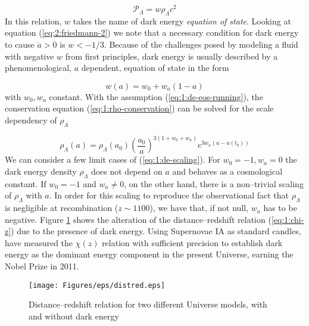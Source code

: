 \begin{equation}
\label{eq:1:de-eos}
\mathcal{P}_\Lambda = w\rho_\Lambda c^2
\end{equation}
%
In this relation, $w$ takes the name of dark energy \textit{equation of state}. Looking at equation (\ref{eq:2:friedmann-2}) we note that a necessary condition for dark energy to cause $\ddot{a}>0$ is $w<-1/3$. Because of the challenges posed by modeling a fluid with negative $w$ from first principles, dark energy is usually described by a phenomenological, $a$ dependent, equation of state in the form \citep{LinderDE}

\begin{equation}
\label{eq:1:de-eos-running}
w(a) = w_0 + w_a(1-a)
\end{equation}
%
with $w_0,w_a$ constant. With the assumption (\ref{eq:1:de-eos-running}), the conservation equation (\ref{eq:1:rho-conservation}) can be solved for the scale dependency of $\rho_\Lambda$

\begin{equation}
\label{eq:1:de-scaling}
\rho_\Lambda(a) = \rho_\Lambda(a_0)\left(\frac{a_0}{a}\right)^{3(1+w_0+w_a)}e^{3w_a(a-a(t_0))} 
\end{equation}
%
We can consider a few limit cases of (\ref{eq:1:de-scaling}). For $w_0=-1,w_a=0$ the dark energy density $\rho_\Lambda$ does not depend on $a$ and behaves as a cosmological constant. If $w_0=-1$ and $w_a\neq 0$, on the other hand, there is a non--trivial scaling of $\rho_\Lambda$ with $a$. In order for this scaling to reproduce the observational fact that $\rho_\Lambda$ is negligible at recombination ($z\sim 1100$), we have that, if not null, $w_a$ has to be negative. Figure \ref{fig:1:distred} shows the alteration of the distance--redshift relation (\ref{eq:1:chi-z}) due to the presence of dark energy. Using Supernovae IA as standard candles, \citep{PerlmutterNobel} have measured the $\chi(z)$ relation with sufficient precision to establish dark energy as the dominant energy component in the present Universe, earning the Nobel Prize in 2011.  

\begin{figure}
\begin{center}
\texttt{[image: Figures/eps/distred.eps]}
\end{center}
\caption{Distance--redshift relation for two different Universe models, with and without dark energy}
\label{fig:1:distred}
\end{figure}    


